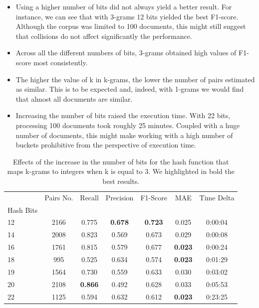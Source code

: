 \documentclass[runningheads]{llncs}
\begin{document}
\begin{itemize}
  \item Using a higher number of bits did not always yield a better result. For instance, we can see that with 3-grams 12 bits yielded the best F1-score.  Although the corpus was limited to 100 documents, this might still suggest that collisions do not affect significantly the performance.
  \item Across all the different numbers of bits, 3-grams obtained high values of F1-score most consistently. 
  \item The higher the value of k in k-grams, the lower the number of pairs estimated as similar. This is to be expected and, indeed, with 1-grams we would find that almost all documents are similar.
  \item Increasing the number of bits raised the execution time. With 22 bits, processing 100 documents took roughly 25 minutes. Coupled with a huge number of documents, this might make working with a high number of buckets prohibitive from the perspective of execution time.  
\end{itemize}

\begin{table}
  \caption{Effects of the increase in the number of bits for the hash function that maps k-grams to integers when k is equal to 3. We highlighted in bold the best results.}
  \label{tab:experiments:buckets_k3}
  \centering
  \begin{tabular}{lcccccc}
    \toprule
    {} &  Pairs No. &  Recall &  Precision &  F1-Score &    MAE & Time Delta \\
    Hash Bits &            &         &            &           &        &            \\
    \midrule
    12        &       2166 &   0.775 &      \textbf{0.678} &     \textbf{0.723} &  0.025 &    0:00:04 \\
    14        &       2008 &   0.823 &      0.569 &     0.673 &  0.029 &    0:00:08 \\
    16        &       1761 &   0.815 &      0.579 &     0.677 &  \textbf{0.023} &    0:00:24 \\
    18        &        995 &   0.525 &      0.634 &     0.574 &  \textbf{0.023} &    0:01:29 \\
    19        &       1564 &   0.730 &      0.559 &     0.633 &  0.030 &    0:03:02 \\
    20        &       2108 &   \textbf{0.866} &      0.492 &     0.628 &  0.033 &    0:05:53 \\
    22        &       1125 &   0.594 &      0.632 &     0.612 &  \textbf{0.023} &    0:23:25 \\
    \bottomrule
    \end{tabular}
\end{table}
\end{document}
